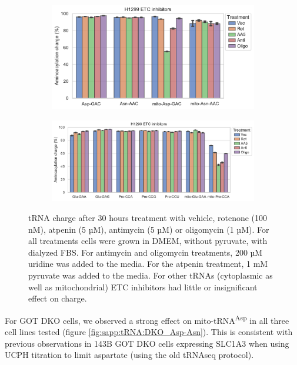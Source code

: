 \begin{figure}[!ht]
     \centering
     \begin{subfigure}[b]{0.6\textwidth}
         \includegraphics[width=\textwidth]{figures/sapp/tRNA/H1299_ETCinhib_Asp-Asn.pdf}
     \end{subfigure}
     \begin{subfigure}[b]{0.8\textwidth}
         \vspace{5pt}
         \includegraphics[width=\textwidth]{figures/sapp/tRNA/H1299_ETCinhib_Glu-Pro.pdf}
     \end{subfigure}
     \hfill
        \caption[ETC inhibitor in H1299, effect on tRNA charge]{
        tRNA charge after 30 hours treatment with vehicle, rotenone (100 nM), atpenin (5 µM), antimycin (5 µM) or oligomycin (1 µM).
        For all treatments cells were grown in DMEM, without pyruvate, with dialyzed FBS.
        For antimycin and oligomycin treatments, 200 µM uridine was added to the media.
        For the atpenin treatment, 1 mM pyruvate was added to the media.
        For other tRNAs (cytoplasmic as well as mitochondrial) ETC inhibitors had little or insignificant effect on charge.
        }
        \label{fig:sapp:tRNA:H1299_ETCinhib}
\end{figure}


\FloatBarrier
For GOT DKO cells, we observed a strong effect on mito-tRNA\textsuperscript{Asp} in all three cell lines tested (figure \ref{fig:sapp:tRNA:DKO_Asp-Asn}).
This is consistent with previous observations in 143B GOT DKO cells expressing SLC1A3 when using UCPH titration to limit aspartate (using the old tRNAseq protocol).


